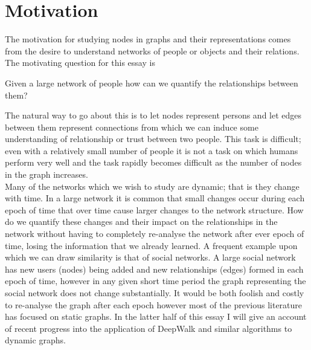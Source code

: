 \documentclass[a4paper]{article}
\begin{document}


\tableofcontents

\section{Motivation}
The motivation for studying nodes in graphs and their representations comes from the desire to understand networks of people or objects and their relations. The motivating question for this essay is
\begin{question}
Given a large network of people how can we quantify the relationships between them?
\end{question}
The natural way to go about this is to let nodes represent persons and let edges
between them represent connections from which we can induce some understanding
of relationship or trust between two people. This task is difficult; even with a
relatively small number of people it is not a task on which humans perform very
well and the task rapidly becomes difficult as the number of nodes in the graph increases.\\
Many of the networks which we wish to study are dynamic; that is they change with time. In a large network it is common that small changes occur during each epoch of time that over time cause larger changes to the network structure. How do we quantify these changes and their impact on the relationships in the network without having to completely re-analyse the network after ever epoch of time, losing the information that we already learned. A frequent example upon which we can draw similarity is that of social networks. A large social network has new users (nodes) being added and new relationships (edges) formed in each epoch of time, however in any given short time period the graph representing the social network does not change substantially. It would be both foolish and costly to re-analyse the graph after each epoch however most of the previous literature has focused on static graphs. In the latter half of this essay I will give an account of recent progress into the application of DeepWalk and similar algorithms to dynamic graphs.
\end{document}
